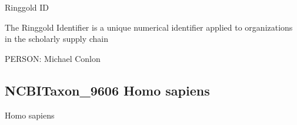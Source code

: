 \documentclass[letterpaper,10pt,english]{sphinxmanual}
\begin{document}
\begin{sphinxShadowBox}

\sphinxAtStartPar
Ringgold ID

\sphinxAtStartPar
{}
\end{sphinxShadowBox}

\begin{sphinxShadowBox}

\sphinxAtStartPar
{\hyperref[\detokenize{doc-IAO_0000578::doc}]{}}
\end{sphinxShadowBox}

\begin{sphinxShadowBox}

\sphinxAtStartPar
The Ringgold Identifier is a unique numerical identifier applied to organizations in the scholarly supply chain
\end{sphinxShadowBox}

\begin{sphinxShadowBox}

\sphinxAtStartPar
{}
\end{sphinxShadowBox}

\begin{sphinxShadowBox}

\sphinxAtStartPar
{}
\end{sphinxShadowBox}

\begin{sphinxShadowBox}

\sphinxAtStartPar
PERSON: Michael Conlon
\end{sphinxShadowBox}
\begin{quote}

\ignorespaces \end{quote}


\subsection{NCBITaxon\_9606 \sphinxhyphen{} Homo sapiens}
\label{\detokenize{doc-NCBITaxon_9606:ncbitaxon-9606-homo-sapiens}}\label{\detokenize{doc-NCBITaxon_9606:index-0}}\label{\detokenize{doc-NCBITaxon_9606::doc}}
\begin{sphinxShadowBox}

\sphinxAtStartPar
Homo sapiens
\end{sphinxShadowBox}
\end{document}
